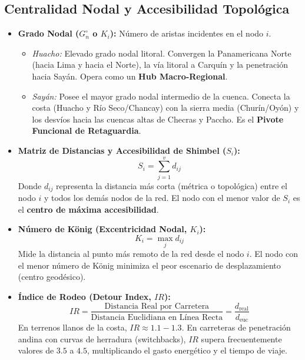 \documentclass[11pt,a4paper]{article}
\begin{document}
\subsection{Centralidad Nodal y Accesibilidad Topológica}
\begin{itemize}[leftmargin=*]
    \item \textbf{Grado Nodal ($G^\circ_n$ o $K_i$):} Número de aristas incidentes en el nodo $i$.
    \begin{itemize}
        \item \emph{Huacho:} Elevado grado nodal litoral. Convergen la Panamericana Norte (hacia Lima y hacia el Norte), la vía litoral a Carquín y la penetración hacia Sayán. Opera como un \textbf{Hub Macro-Regional}.
        \item \emph{Sayán:} Posee el mayor grado nodal intermedio de la cuenca. Conecta la costa (Huacho y Río Seco/Chancay) con la sierra media (Churín/Oyón) y los desvíos hacia las cuencas altas de Checras y Paccho. Es el \textbf{Pivote Funcional de Retaguardia}.
    \end{itemize}
    \item \textbf{Matriz de Distancias y Accesibilidad de Shimbel ($S_i$):}
    \begin{equation}
        S_i = \sum_{j=1}^{v} d_{ij}
    \end{equation}
    Donde $d_{ij}$ representa la distancia más corta (métrica o topológica) entre el nodo $i$ y todos los demás nodos de la red. El nodo con el menor valor de $S_i$ es el \textbf{centro de máxima accesibilidad}.
    \item \textbf{Número de König (Excentricidad Nodal, $K_i$):}
    \begin{equation}
        K_i = \max_{j} d_{ij}
    \end{equation}
    Mide la distancia al punto más remoto de la red desde el nodo $i$. El nodo con el menor número de König minimiza el peor escenario de desplazamiento (centro geodésico).
    \item \textbf{Índice de Rodeo (Detour Index, $IR$):}
    \begin{equation}
        IR = \frac{\text{Distancia Real por Carretera}}{\text{Distancia Euclidiana en Línea Recta}} = \frac{d_{\text{real}}}{d_{\text{euc}}}
    \end{equation}
    En terrenos llanos de la costa, $IR \approx 1.1 - 1.3$. En carreteras de penetración andina con curvas de herradura (switchbacks), $IR$ supera frecuentemente valores de $3.5$ a $4.5$, multiplicando el gasto energético y el tiempo de viaje.
\end{itemize}
\end{document}
